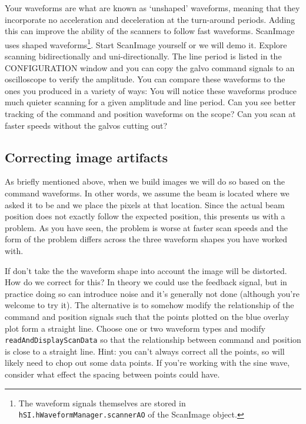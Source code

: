 \documentclass[a4paper]{report}
\begin{document}
Your waveforms are what are known as `unshaped' waveforms, meaning that they incorporate no acceleration and deceleration at the turn-around periods. 
Adding this can improve the ability of the scanners to follow fast waveforms.
ScanImage uses shaped waveforms\footnote{The waveform signals themselves are stored in \texttt{hSI.hWaveformManager.scannerAO} of the ScanImage object.}.
Start ScanImage yourself or we will demo it. 
Explore scanning bidirectionally and uni-directionally. 
The line period is listed in the CONFIGURATION window and you can copy the galvo command signals to an oscilloscope to verify the amplitude. 
You can compare these waveforms to the ones you produced in a variety of ways: 
You will notice these waveforms produce much quieter scanning for a given amplitude and line period.
Can you see better tracking of the command and position waveforms on the scope?
Can you scan at faster speeds without the galvos cutting out? 


\subsection{Correcting image artifacts}
As briefly mentioned above, when we build images we will do so based on the command waveforms. 
In other words, we assume the beam is located where we asked it to be and we place the pixels at that location.
Since the actual beam position does not exactly follow the expected position, this presents us with a problem. 
As you have seen, the problem is worse at faster scan speeds and the form of the problem differs across the three waveform shapes you have worked with.

If don't take the the waveform shape into account the image will be distorted. 
How do we correct for this?
In theory we could use the feedback signal, but in practice doing so can introduce noise and it's generally not done (although you're welcome to try it). 
The alternative is to somehow modify the relationship of the command and position signals such that the points plotted on the blue overlay plot form a straight line.
Choose one or two waveform types and modify \texttt{readAndDisplayScanData} so that the relationship between command and position is close to a straight line. 
Hint: you can't always correct all the points, so will likely need to chop out some data points. 
If you're working with the sine wave, consider what effect the spacing between points could have.
\end{document}

